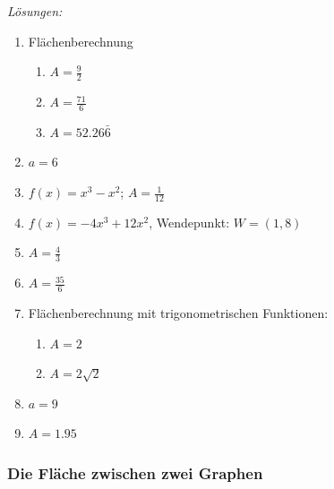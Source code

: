\clearpage
\emph{Lösungen:}
\begin{enumerate}
	\item Flächenberechnung
	      \begin{enumerate}
		      \item \(A=\frac{9}{2}\)
		      \item \(A= \frac{71}{6}\)
		      \item \(A=52.26\bar{6}\)
	      \end{enumerate}
	\item \(a=6\)
	\item \(f(x)=x^3 - x^2\); \(A=\frac{1}{12}\)
	\item \(f(x)= -4x^3+12x^2\),  Wendepunkt: \(W=(1, 8)\)
	\item \(A=\frac{4}{3}\)
	\item \(A=\frac{35}{6}\)
	\item Flächenberechnung mit trigonometrischen Funktionen:
	      \begin{enumerate}
		      \item \(A=2\)
		      \item \(A=2\sqrt{2}\)
	      \end{enumerate}
	\item \(a=9\)
	\item \(A=1.95\)
\end{enumerate}













































\clearpage
\subsubsection{Die Fläche zwischen zwei Graphen}

